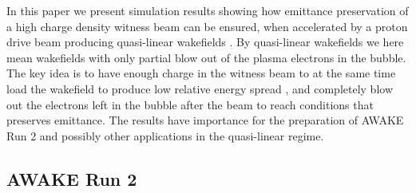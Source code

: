 \documentclass[aps,prstab,reprint,amsmath,amssymb,groupedaddress,onecolumn]{revtex4-1}
\begin{document}
In this paper we present simulation results showing how emittance preservation of a high charge density witness beam can be ensured, when accelerated by a proton drive beam producing quasi-linear wakefields \cite{rosenzweig:2010}.  By quasi-linear wakefields we here mean wakefields with only partial blow out of the plasma electrons in the bubble.
The key idea is to have enough charge in the witness beam to at the same time load the wakefield to produce low
relative energy spread%
, and completely blow out the electrons left in the bubble after the beam to reach conditions that preserves emittance.
The results have importance for the preparation of AWAKE Run 2 and possibly other applications in the quasi-linear regime.  




\subsection{AWAKE Run 2}\label{S:I:AWAKE}
\end{document}
